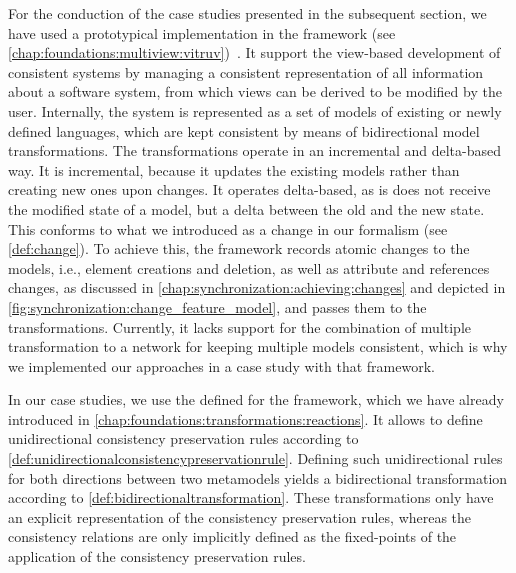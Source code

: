 For the conduction of the case studies presented in the subsequent section, we have used a prototypical implementation in the \vitruv framework (see \autoref{chap:foundations:multiview:vitruv})~\cite{klare2020Vitruv-JSS}.
It support the view-based development of consistent systems by managing a consistent representation of all information about a software system, from which views can be derived to be modified by the user.
Internally, the system is represented as a set of models of existing or newly defined languages, which are kept consistent by means of bidirectional model transformations.
The transformations operate in an incremental and delta-based way. 
It is incremental, because it updates the existing models rather than creating new ones upon changes.
It operates delta-based, as is does not receive the modified state of a model, but a delta between the old and the new state.
This conforms to what we introduced as a change in our formalism (see \autoref{def:change}).
To achieve this, the framework records atomic changes to the models, i.e., element creations and deletion, as well as attribute and references changes, as discussed in \autoref{chap:synchronization:achieving:changes} and depicted in \autoref{fig:synchronization:change_feature_model}, and passes them to the transformations.
Currently, it lacks support for the combination of multiple transformation to a network for keeping multiple models consistent, which is why we implemented our approaches in a case study with that framework.

In our case studies, we use the \reactionslanguage defined for the \vitruv framework, which we have already introduced in \autoref{chap:foundations:transformations:reactions}.
It allows to define unidirectional consistency preservation rules according to \autoref{def:unidirectionalconsistencypreservationrule}.
Defining such unidirectional rules for both directions between two metamodels yields a bidirectional transformation according to \autoref{def:bidirectionaltransformation}.
These transformations only have an explicit representation of the consistency preservation rules, whereas the consistency relations are only implicitly defined as the fixed-points of the application of the consistency preservation rules.

